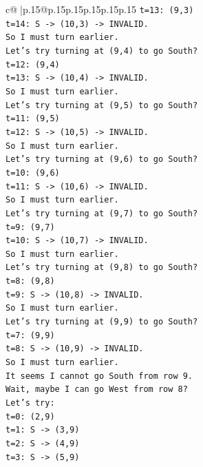 \documentclass{article}
\begin{document}
{\begin{supertabular}{c@{$\;$}|p{.15\linewidth}@{}p{.15\linewidth}p{.15\linewidth}p{.15\linewidth}p{.15\linewidth}p{.15\linewidth}}
{{{\texttt{t=13: (9,3)} \\
\texttt{t=14: S {-}> (10,3) {-}> INVALID.} \\
\texttt{So I must turn earlier.} \\
\texttt{Let's try turning at (9,4) to go South?} \\
\texttt{t=12: (9,4)} \\
\texttt{t=13: S {-}> (10,4) {-}> INVALID.} \\
\texttt{So I must turn earlier.} \\
\texttt{Let's try turning at (9,5) to go South?} \\
\texttt{t=11: (9,5)} \\
\texttt{t=12: S {-}> (10,5) {-}> INVALID.} \\
\texttt{So I must turn earlier.} \\
\texttt{Let's try turning at (9,6) to go South?} \\
\texttt{t=10: (9,6)} \\
\texttt{t=11: S {-}> (10,6) {-}> INVALID.} \\
\texttt{So I must turn earlier.} \\
\texttt{Let's try turning at (9,7) to go South?} \\
\texttt{t=9: (9,7)} \\
\texttt{t=10: S {-}> (10,7) {-}> INVALID.} \\
\texttt{So I must turn earlier.} \\
\texttt{Let's try turning at (9,8) to go South?} \\
\texttt{t=8: (9,8)} \\
\texttt{t=9: S {-}> (10,8) {-}> INVALID.} \\
\texttt{So I must turn earlier.} \\
\texttt{Let's try turning at (9,9) to go South?} \\
\texttt{t=7: (9,9)} \\
\texttt{t=8: S {-}> (10,9) {-}> INVALID.} \\
\texttt{So I must turn earlier.} \\
\texttt{It seems I cannot go South from row 9.} \\
\texttt{Wait, maybe I can go West from row 8?} \\
\texttt{Let's try:} \\
\texttt{t=0: (2,9)} \\
\texttt{t=1: S {-}> (3,9)} \\
\texttt{t=2: S {-}> (4,9)} \\
\texttt{t=3: S {-}> (5,9)} \\
}}}
\end{supertabular}}
\end{document}
